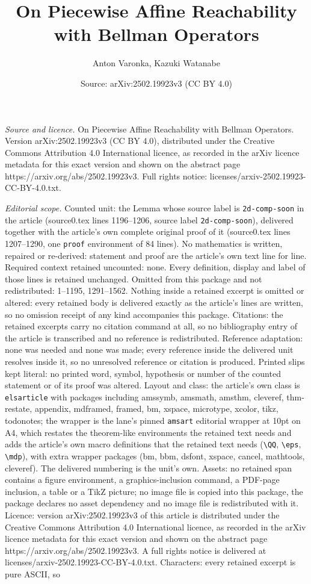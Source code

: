 \documentclass[10pt,a4paper]{amsart}
\title[On Piecewise Affine Reachability with Bellman Operators]{On Piecewise Affine Reachability with Bellman Operators}
\author{Anton Varonka, Kazuki Watanabe}
\date{Source: arXiv:2502.19923v3 (CC BY 4.0)}
\begin{document}
\maketitle

\noindent\emph{Source and licence.} On Piecewise Affine Reachability with Bellman Operators. Version arXiv:2502.19923v3 (CC BY 4.0), distributed under the Creative Commons Attribution 4.0 International licence, as recorded in the arXiv licence metadata for this exact version and shown on the abstract page https://arxiv.org/abs/2502.19923v3. Full rights notice: licenses/arxiv-2502.19923-CC-BY-4.0.txt.\par\smallskip

\noindent\textit{Editorial scope.} Counted unit: the Lemma whose source label is \texttt{2d-comp-soon} in the article (source0.tex lines 1196--1206, source label \texttt{2d-comp-soon}), delivered together with the article's own complete original proof of it (source0.tex lines 1207--1290, one \texttt{proof} environment of 84 lines). No mathematics is written, repaired or re-derived: statement and proof are the article's own text line for line. Required context retained uncounted: none. Every definition, display and label of those lines is retained unchanged. Omitted from this package and not redistributed: 1--1195, 1291--1562. Nothing inside a retained excerpt is omitted or altered: every retained body is delivered exactly as the article's lines are written, so no omission receipt of any kind accompanies this package. Citations: the retained excerpts carry no citation command at all, so no bibliography entry of the article is transcribed and no reference is redistributed. Reference adaptation: none was needed and none was made; every reference inside the delivered unit resolves inside it, so no unresolved reference or citation is produced. Printed slips kept literal: no printed word, symbol, hypothesis or number of the counted statement or of its proof was altered. Layout and class: the article's own class is \texttt{elsarticle} with packages including amssymb, amsmath, amsthm, cleveref, thm-restate, appendix, mdframed, framed, bm, xspace, microtype, xcolor, tikz, todonotes; the wrapper is the lane's pinned \texttt{amsart} editorial wrapper at 10pt on A4, which restates the theorem-like environments the retained text needs and adds the article's own macro definitions that the retained text needs (\texttt{\textbackslash QQ}, \texttt{\textbackslash eps}, \texttt{\textbackslash mdp}), with extra wrapper packages (bm, bbm, dsfont, xspace, cancel, mathtools, cleveref). The delivered numbering is the unit's own. Assets: no retained span contains a figure environment, a graphics-inclusion command, a PDF-page inclusion, a table or a TikZ picture; no image file is copied into this package, the package declares no asset dependency and no image file is redistributed with it. Licence: version arXiv:2502.19923v3 of this article is distributed under the Creative Commons Attribution 4.0 International licence, as recorded in the arXiv licence metadata for this exact version and shown on the abstract page https://arxiv.org/abs/2502.19923v3. A full rights notice is delivered at licenses/arxiv-2502.19923-CC-BY-4.0.txt. Characters: every retained excerpt is pure ASCII, so 
\end{document}
